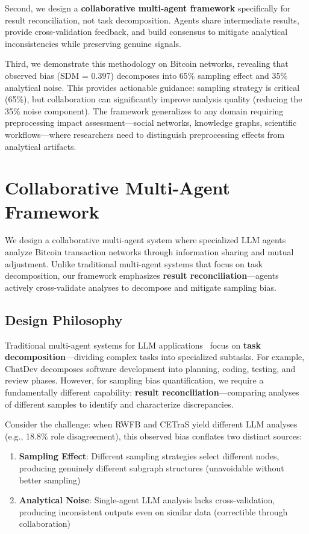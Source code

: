 \documentclass[conference]{IEEEtran}
\begin{document}
Second, we design a \textbf{collaborative multi-agent framework} specifically for result reconciliation, not task decomposition. Agents share intermediate results, provide cross-validation feedback, and build consensus to mitigate analytical inconsistencies while preserving genuine signals.

Third, we demonstrate this methodology on Bitcoin networks, revealing that observed bias (SDM = 0.397) decomposes into 65\% sampling effect and 35\% analytical noise. This provides actionable guidance: sampling strategy is critical (65\%), but collaboration can significantly improve analysis quality (reducing the 35\% noise component). The framework generalizes to any domain requiring preprocessing impact assessment---social networks, knowledge graphs, scientific workflows---where researchers need to distinguish preprocessing effects from analytical artifacts.

\section{Collaborative Multi-Agent Framework}\label{sec:framework}

We design a collaborative multi-agent system where specialized LLM agents analyze Bitcoin transaction networks through information sharing and mutual adjustment. Unlike traditional multi-agent systems that focus on task decomposition, our framework emphasizes \textbf{result reconciliation}---agents actively cross-validate analyses to decompose and mitigate sampling bias.

\subsection{Design Philosophy}

Traditional multi-agent systems for LLM applications~\cite{qian2023communicative,wang2023scientific} focus on \textbf{task decomposition}---dividing complex tasks into specialized subtasks. For example, ChatDev decomposes software development into planning, coding, testing, and review phases. However, for sampling bias quantification, we require a fundamentally different capability: \textbf{result reconciliation}---comparing analyses of different samples to identify and characterize discrepancies.

Consider the challenge: when RWFB and CETraS yield different LLM analyses (e.g., 18.8\% role disagreement), this observed bias conflates two distinct sources:
\begin{enumerate}
    \item \textbf{Sampling Effect}: Different sampling strategies select different nodes, producing genuinely different subgraph structures (unavoidable without better sampling)
    \item \textbf{Analytical Noise}: Single-agent LLM analysis lacks cross-validation, producing inconsistent outputs even on similar data (correctible through collaboration)
\end{enumerate}
\end{document}
